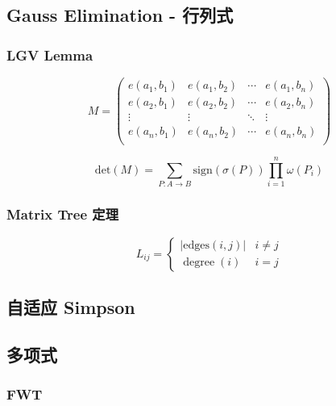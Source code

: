 \documentclass[../template.tex]{subfiles}
\begin{document}
\subsection{Gauss Elimination - 行列式}

	\subsubsection{LGV Lemma}
		\[
		M=
		\begin{pmatrix}
		e(a_1,b_1) & e(a_1,b_2) & \cdots & e(a_1,b_n) \\
		e(a_2,b_1) & e(a_2,b_2) & \cdots & e(a_2,b_n) \\
		\vdots & \vdots & \ddots & \vdots \\
		e(a_n,b_1) & e(a_n,b_2) & \cdots & e(a_n,b_n) \\
		\end{pmatrix}
		\]

		\[
		\mathrm{det}(M)=\sum_{P:A\to B}{\mathrm{sign}(\sigma(P))\prod_{i=1}^{n}\omega(P_i)}
		\]

	\subsubsection{Matrix Tree 定理}
		\[
		L_{ij}=\left\{
			\begin{matrix}
				\vert \text{edges}(i,j)\vert & i\not=j \\
				\operatorname{degree}(i) & i=j
			\end{matrix}
			\right.
		\]

\subsection{自适应 Simpson}

\subsection{多项式}
	\subsubsection{FWT}
\end{document}
